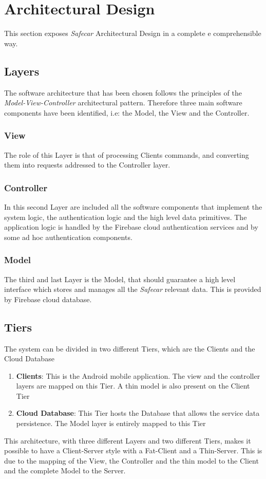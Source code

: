 \chapter{Architectural Design} \label{chap3}
This section exposes \textit{Safecar} Architectural Design in a complete e comprehensible way.

\section{Layers}
The software architecture that has been chosen follows the principles of the \textit{Model-View-Controller} architectural pattern. Therefore three main software components have been identified, i.e: the Model, the View and the Controller.

\subsection{View}
The role of this Layer is that of processing Clients commands, and converting them into requests addressed to the Controller layer.

\subsection{Controller}
In this second Layer are included all the software components that implement the system logic, the authentication logic and the high level data primitives. The application logic is handled by the Firebase cloud authentication services and by some ad hoc authentication components.

\subsection{Model}
The third and last Layer is the Model, that should guarantee a high level interface which stores and manages all the \textit{Safecar} relevant data. This is provided by Firebase cloud database.

\section{Tiers}
The system can be divided in two different Tiers, which are the Clients and the Cloud Database

\begin{enumerate}
	\item \textbf{Clients}: This is the Android mobile application. The view and the controller layers are mapped on this Tier. A thin model is also present on the Client Tier
	\item \textbf{Cloud Database}: This Tier hosts the Database that allows the service data persistence. The Model layer is entirely mapped to this Tier
\end{enumerate}
This architecture, with three different Layers and two different Tiers, makes it possible to have a Client-Server style with a Fat-Client and a Thin-Server. This is due to the mapping of the View, the Controller and the thin model to the Client and the complete Model to the Server.

